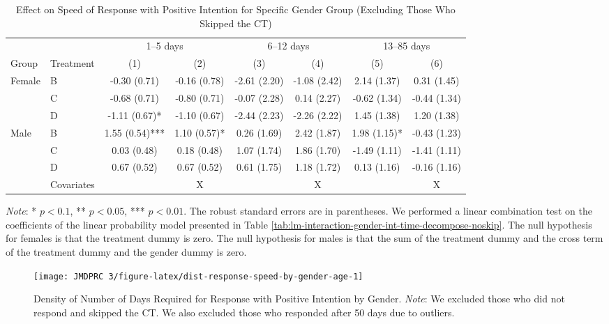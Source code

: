 \documentclass[12pt, a4paper]{article}
\begin{document}
\begin{table}[H]

\caption{\label{tab:lh-interaction-gender-int-time-decompose-noskip}Effect on Speed of Response with Positive Intention for Specific Gender Group (Excluding Those Who Skipped the CT)}
\centering
\fontsize{8}{10}\selectfont
\begin{threeparttable}
\begin{tabular}[t]{llcccccc}
\toprule
\multicolumn{2}{c}{ } & \multicolumn{2}{c}{1--5 days} & \multicolumn{2}{c}{6--12 days} & \multicolumn{2}{c}{13--85 days} \\
\cmidrule(l{3pt}r{3pt}){3-4} \cmidrule(l{3pt}r{3pt}){5-6} \cmidrule(l{3pt}r{3pt}){7-8}
Group & Treatment & (1) & (2) & (3) & (4) & (5) & (6)\\
\midrule
Female & B & -0.30 (0.71) & -0.16 (0.78) & -2.61 (2.20) & -1.08 (2.42) & 2.14 (1.37) & 0.31 (1.45)\\
 & C & -0.68 (0.71) & -0.80 (0.71) & -0.07 (2.28) & 0.14 (2.27) & -0.62 (1.34) & -0.44 (1.34)\\
 & D & -1.11 (0.67)* & -1.10 (0.67) & -2.44 (2.23) & -2.26 (2.22) & 1.45 (1.38) & 1.20 (1.38)\\
Male & B & 1.55 (0.54)*** & 1.10 (0.57)* & 0.26 (1.69) & 2.42 (1.87) & 1.98 (1.15)* & -0.43 (1.23)\\
 & C & 0.03 (0.48) & 0.18 (0.48) & 1.07 (1.74) & 1.86 (1.70) & -1.49 (1.11) & -1.41 (1.11)\\
 & D & 0.67 (0.52) & 0.67 (0.52) & 0.61 (1.75) & 1.18 (1.72) & 0.13 (1.16) & -0.16 (1.16)\\
\midrule
 & Covariates &  & X &  & X &  & X\\
\bottomrule
\end{tabular}
\begin{tablenotes}
\item \emph{Note}: * $p < 0.1$, ** $p < 0.05$, *** $p < 0.01$. The robust standard errors are in parentheses. We performed a linear combination test on the coefficients of the linear probability model presented in Table \ref{tab:lm-interaction-gender-int-time-decompose-noskip}. The null hypothesis for females is that the treatment dummy is zero. The null hypothesis for males is that the sum of the treatment dummy and the cross term of the treatment dummy and the gender dummy is zero.
\end{tablenotes}
\end{threeparttable}
\end{table}

\begin{figure}[H]
\texttt{[image: JMDPRC~3/figure-latex/dist-response-speed-by-gender-age-1]} \caption{Density of Number of Days Required for Response with Positive Intention by Gender. \newline \emph{Note}: We excluded those who did not respond and skipped the CT. We also excluded those who responded after 50 days due to outliers.}\label{fig:dist-response-speed-by-gender-age}
\end{figure}
\end{document}
